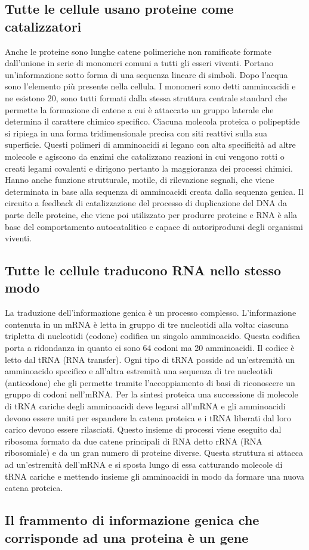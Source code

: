 \subsection{Tutte le cellule usano proteine come catalizzatori}
Anche le proteine sono lunghe catene polimeriche non ramificate formate dall'unione in serie di monomeri comuni a tutti gli esseri viventi. Portano 
un'informazione sotto forma di una sequenza lineare di simboli. Dopo l'acqua sono l'elemento pi\`u presente nella cellula. I monomeri sono detti amminoacidi
e ne esistono 20, sono tutti formati dalla stessa struttura centrale standard che permette la formazione di catene a cui \`e attaccato un gruppo laterale 
che determina il carattere chimico specifico. Ciacuna molecola proteica o polipeptide si ripiega in una forma tridimensionale precisa con siti reattivi 
sulla sua superficie. Questi polimeri di amminoacidi si legano con alta specificit\`a ad altre molecole e agiscono da enzimi che catalizzano reazioni in cui
vengono rotti o creati legami covalenti e dirigono pertanto la maggioranza dei processi chimici. Hanno anche funzione strutturale, motile, di rilevazione
segnali, che viene determinata in base alla sequenza di amminoacidi creata dalla sequenza genica. Il circuito a feedback di catalizzazione del processo di
duplicazione del DNA da parte delle proteine, che viene poi utilizzato per produrre proteine e RNA \`e alla base del comportamento autocatalitico e capace 
di autoriprodursi degli organismi viventi. 
\subsection{Tutte le cellule traducono RNA nello stesso modo}
La traduzione dell'informazione genica \`e un processo complesso. L'informazione contenuta in un mRNA \`e letta in gruppo di tre nucleotidi alla volta: 
ciascuna tripletta di nucleotidi (codone) codifica un singolo amminoacido. Questa codifica porta a ridondanza in quanto ci sono 64 codoni ma 20 amminoacidi.
Il codice \`e letto dal tRNA (RNA transfer). Ogni tipo di tRNA posside ad un'estremit\`a un amminoacido specifico e all'altra estremit\`a una sequenza di
tre nucleotidi (anticodone) che gli permette tramite l'accoppiamento di basi di riconoscere un gruppo di codoni nell'mRNA. Per la sintesi proteica una 
successione di molecole di tRNA cariche degli amminoacidi deve legarsi all'mRNA e gli amminoacidi devono essere uniti per espandere la catena proteica e i 
tRNA liberati dal loro carico devono essere rilasciati. Questo insieme di processi viene eseguito dal ribosoma formato da due catene principali di RNA
detto rRNA (RNA ribosomiale) e da un gran numero di proteine diverse. Questa struttura si attacca ad un'estremit\`a dell'mRNA e si sposta lungo di essa
catturando molecole di tRNA cariche e mettendo insieme gli amminoacidi in modo da formare una nuova catena proteica. 
\subsection{Il frammento di informazione genica che corrisponde ad una proteina \`e un gene}
